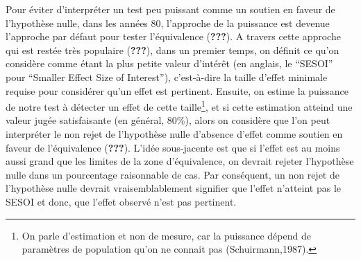 \documentclass[
  english,
  man]{apa6}
\begin{document}
Pour éviter d'interpréter un test peu puissant comme un soutien en faveur de l'hypothèse nulle, dans les années 80, l'approche de la puissance est devenue l'approche par défaut pour tester l'équivalence ({\textbf{???}}). A travers cette approche qui est restée très populaire ({\textbf{???}}), dans un premier temps, on définit ce qu'on considère comme étant la plus petite valeur d'intérêt (en anglais, le \enquote{SESOI} pour \enquote{Smaller Effect Size of Interest}), c'est-à-dire la taille d'effet minimale requise pour considérer qu'un effet est pertinent. Ensuite, on estime la puissance de notre test à détecter un effet de cette taille\footnote{On parle d'estimation et non de mesure, car la puissance dépend de paramètres de population qu'on ne connait pas (Schuirmann,1987).}, et si cette estimation atteind une valeur jugée satisfaisante (en général, 80\%), alors on considère que l'on peut interpréter le non rejet de l'hypothèse nulle d'absence d'effet comme soutien en faveur de l'équivalence ({\textbf{???}}). L'idée sous-jacente est que si l'effet est au moins aussi grand que les limites de la zone d'équivalence, on devrait rejeter l'hypothèse nulle dans un pourcentage raisonnable de cas. Par conséquent, un non rejet de l'hypothèse nulle devrait vraisemblablement signifier que l'effet n'atteint pas le SESOI et donc, que l'effet observé n'est pas pertinent.
\end{document}
